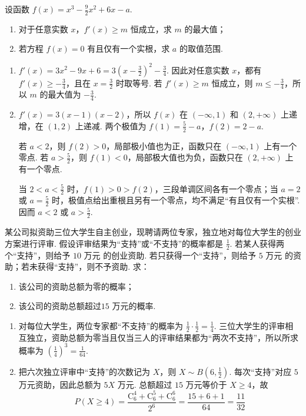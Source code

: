 \begin{problem}
设函数 \( f(x) = x^3 - \frac{9}{2} x^2 + 6x - a \).

\begin{enumerate}
\item 对于任意实数 \(x\)，\(f'(x) \geqslant m\) 恒成立，求 \(m\) 的最大值；
\item 若方程 \( f(x)=0 \) 有且仅有一个实根，求 \(a\) 的取值范围.
\end{enumerate}
\begin{solution}
\begin{enumerate}
\item
\(f'(x)=3x^{2}-9x+6=3\left(x-\frac32\right)^{2}-\frac34\). 因此对任意实数 \(x\)，都有 \(f'(x)\geqslant-\frac34\)，且在 \(x=\frac32\) 时取等号. 若 \(f'(x)\geqslant m\) 恒成立，则 \(m\leqslant-\frac34\)，所以 \(m\) 的最大值为 \(-\frac34\).

\item
\(f'(x)=3(x-1)(x-2)\)，所以 \(f(x)\) 在 \((-\infty,1)\) 和 \((2,+\infty)\) 上递增，在 \((1,2)\) 上递减. 两个极值为
\(f(1)=\frac52-a\)，\(f(2)=2-a\).

若 \(a<2\)，则 \(f(2)>0\)，局部极小值也为正，函数只在 \((-\infty,1)\) 上有一个零点. 若 \(a>\frac52\)，则 \(f(1)<0\)，局部极大值也为负，函数只在 \((2,+\infty)\) 上有一个零点.

当 \(2<a<\frac52\) 时，\(f(1)>0>f(2)\)，三段单调区间各有一个零点；当 \(a=2\) 或 \(a=\frac52\) 时，极值点给出重根且另有一个零点，均不满足“有且仅有一个实根”. 因而 \(a<2\) 或 \(a>\frac52\).
\end{enumerate}
\end{solution}
\end{problem}

\begin{problem}
某公司拟资助三位大学生自主创业，现聘请两位专家，独立地对每位大学生的创业方案进行评审. 假设评审结果为“支持”或“不支持”的概率都是 \(\frac{1}{2}\). 若某人获得两个“支持”，则给予 \(10\text{ 万元}\) 的创业资助. 若只获得一个“支持”，则给予 \(5\text{ 万元}\) 的资助；若未获得“支持”，则不予资助. 求：

\begin{enumerate}
\item 该公司的资助总额为零的概率；
\item 该公司的资助总额超过\(15\text{ 万元}\)的概率.
\end{enumerate}
\begin{solution}
\begin{enumerate}
\item
对每位大学生，两位专家都“不支持”的概率为 \(\frac12\cdot\frac12=\frac14\). 三位大学生的评审相互独立，资助总额为零当且仅当三人的评审结果都为“两次不支持”，所以所求概率为 \(\left(\frac14\right)^{3}=\frac1{64}\).

\item
把六次独立评审中“支持”的次数记为 \(X\)，则 \(X\sim B\left(6,\frac12\right)\). 每次“支持”对应 \(5\) 万元资助，因此总额为 \(5X\) 万元. 总额超过 \(15\) 万元等价于 \(X\geqslant4\)，故
\[
P(X\geqslant4)=\frac{\mathrm C_6^4+\mathrm C_6^5+\mathrm C_6^6}{2^6}=\frac{15+6+1}{64}=\frac{11}{32}
\]
\end{enumerate}
\end{solution}
\end{problem}


